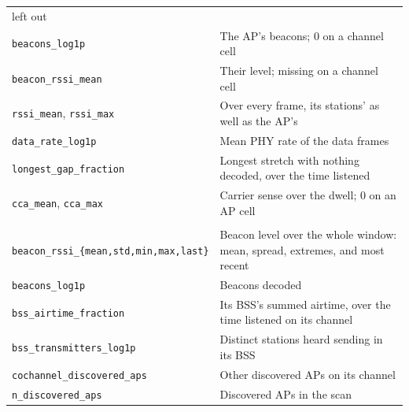 \documentclass[conference]{IEEEtran}
\newcommand{\code}[1]{\texttt{\small #1}}
\begin{document}
\begin{table}[!b]
\begin{tabularx}{\textwidth}{@{}lX@{}}
left out \\
\code{beacons\_log1p} & The AP's beacons; 0 on a channel cell \\
\code{beacon\_rssi\_mean} & Their level; missing on a channel cell \\
\code{rssi\_mean}, \code{rssi\_max} & Over every frame, its stations' as well as
the AP's \\
\code{data\_rate\_log1p} & Mean PHY rate of the data frames \\
\code{longest\_gap\_fraction} & Longest stretch with nothing decoded, over the
time listened \\
\code{cca\_mean}, \code{cca\_max} & Carrier sense over the dwell; 0 on an AP
cell \\
\addlinespace
\multicolumn{2}{@{}l}{\textbf{AP descriptor}} \\
\code{beacon\_rssi\_\{mean,std,min,max,last\}} & Beacon level over the whole
window: mean, spread, extremes, and most recent \\
\code{beacons\_log1p} & Beacons decoded \\
\code{bss\_airtime\_fraction} & Its BSS's summed airtime, over the time listened
on its channel \\
\code{bss\_transmitters\_log1p} & Distinct stations heard sending in its BSS \\
\code{cochannel\_discovered\_aps} & Other discovered APs on its channel \\
\code{n\_discovered\_aps} & Discovered APs in the scan \\
\bottomrule
\end{tabularx}
\end{table}
\end{document}
